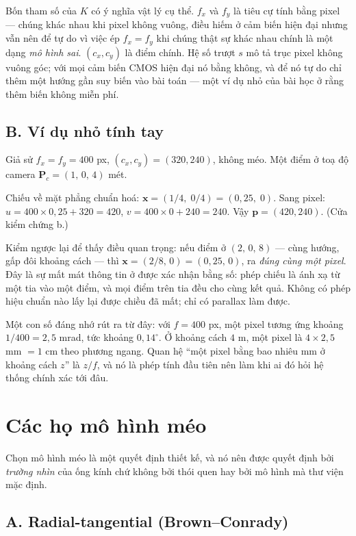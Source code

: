 \documentclass[../../vslam.tex]{subfiles}
\begin{document}
Bốn tham số của \(K\) có ý nghĩa vật lý cụ thể. \(f_x\) và \(f_y\) là tiêu cự tính bằng pixel --- chúng khác nhau khi pixel không vuông, điều hiếm ở cảm biến hiện đại nhưng vẫn nên để tự do vì việc ép \(f_x = f_y\) khi chúng thật sự khác nhau chính là một dạng \emph{mô hình sai}. \((c_x, c_y)\) là điểm chính. Hệ số trượt \(s\) mô tả trục pixel không vuông góc; với mọi cảm biến CMOS hiện đại nó bằng không, và để nó tự do chỉ thêm một hướng gần suy biến vào bài toán --- một ví dụ nhỏ của bài học ở  rằng thêm biến không miễn phí.

\subsection{B. Ví dụ nhỏ tính tay}

Giả sử \(f_x = f_y = 400\) px, \((c_x, c_y) = (320, 240)\), không méo. Một điểm ở toạ độ camera \(\mathbf{P}_c = (1,\, 0,\, 4)\) mét.

Chiếu về mặt phẳng chuẩn hoá: \(\mathbf{x} = (1/4,\; 0/4) = (0{,}25,\; 0)\). Sang pixel: \(u = 400 \times 0{,}25 + 320 = 420\), \(v = 400 \times 0 + 240 = 240\). Vậy \(\mathbf{p} = (420, 240)\). (Cửa kiểm chứng b.)

Kiểm ngược lại để thấy điều quan trọng: nếu điểm ở \((2,\, 0,\, 8)\) --- cùng hướng, gấp đôi khoảng cách --- thì \(\mathbf{x} = (2/8,\, 0) = (0{,}25,\, 0)\), ra \emph{đúng cùng một pixel}. Đây là sự mất mát thông tin ở  được xác nhận bằng số: phép chiếu là ánh xạ từ một tia vào một điểm, và mọi điểm trên tia đều cho cùng kết quả. Không có phép hiệu chuẩn nào lấy lại được chiều đã mất; chỉ có parallax làm được.

Một con số đáng nhớ rút ra từ đây: với \(f = 400\) px, một pixel tương ứng khoảng \(1/400 = 2{,}5\) mrad, tức khoảng \(0{,}14^\circ\). Ở khoảng cách \(4\) m, một pixel là \(4 \times 2{,}5\) mm \(= 1\) cm theo phương ngang. Quan hệ ``một pixel bằng bao nhiêu mm ở khoảng cách \(z\)'' là \(z/f\), và nó là phép tính đầu tiên nên làm khi ai đó hỏi hệ thống chính xác tới đâu.

\section{Các họ mô hình méo}

Chọn mô hình méo là một quyết định thiết kế, và nó nên được quyết định bởi \emph{trường nhìn} của ống kính chứ không bởi thói quen hay bởi mô hình mà thư viện mặc định.

\subsection{A. Radial-tangential (Brown--Conrady)}
\end{document}
